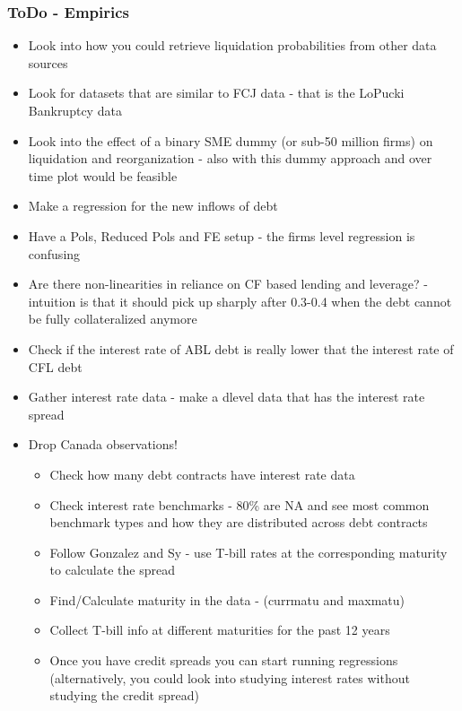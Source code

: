\documentclass[12pt]{article}
\begin{document}
\subsubsection*{ToDo - Empirics}
\begin{itemize}\setlength\itemsep{0em} \small
    \item Look into how you could retrieve liquidation probabilities from other data sources \checkmark
    \item Look for datasets that are similar to FCJ data - that is the LoPucki Bankruptcy data \checkmark
    \item Look into the effect of a binary SME dummy (or sub-50 million firms) on liquidation and reorganization - also with this dummy approach and over time plot would be feasible \checkmark
    \item Make a regression for the new inflows of debt \checkmark
    \item Have a Pols, Reduced Pols and FE  setup - the firms level regression is confusing
    \item Are there non-linearities in reliance on CF based lending and leverage? - intuition is that it should pick up sharply after 0.3-0.4 when the debt cannot be fully collateralized anymore 
    \item Check if the interest rate of ABL debt is really lower that the interest rate of CFL debt \checkmark
    \item Gather interest rate data - make a dlevel data that has the interest rate spread \checkmark
    \item Drop Canada observations! 
    \begin{itemize} 
        \item Check how many debt contracts have interest rate data \checkmark
        \item Check interest rate benchmarks - 80\% are NA and see most common benchmark types and how they are distributed across debt contracts  \checkmark
        \item Follow Gonzalez and Sy - use T-bill rates at the corresponding maturity to calculate the spread \checkmark
        \item Find/Calculate maturity in the data - (currmatu and maxmatu) \checkmark
        \item Collect T-bill info at different maturities for the past 12 years \checkmark
        \item Once you have credit spreads you can start running regressions (alternatively, you could look into studying interest rates without studying the credit spread) \checkmark

\end{itemize}
\end{itemize}
\end{document}
